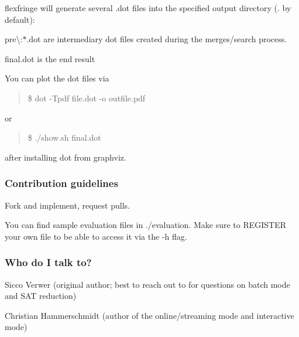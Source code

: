flexfringe will generate several .dot files into the specified output directory (. by default)\+:


\begin{DoxyItemize}
\item pre\textbackslash{}\+:$\ast$.dot are intermediary dot files created during the merges/search process.
\item final.\+dot is the end result
\end{DoxyItemize}

You can plot the dot files via

\begin{quote}
\$ dot -\/\+Tpdf file.\+dot -\/o outfile.\+pdf \end{quote}
or \begin{quote}
\$ ./show.sh final.\+dot \end{quote}


after installing dot from graphviz.

\subsubsection*{Contribution guidelines}


\begin{DoxyItemize}
\item Fork and implement, request pulls.
\item You can find sample evaluation files in ./evaluation. Make sure to R\+E\+G\+I\+S\+T\+ER your own file to be able to access it via the -\/h flag.
\end{DoxyItemize}

\subsubsection*{Who do I talk to?}


\begin{DoxyItemize}
\item Sicco Verwer (original author; best to reach out to for questions on batch mode and S\+AT reduction)
\item Christian Hammerschmidt (author of the online/streaming mode and interactive mode) 
\end{DoxyItemize}